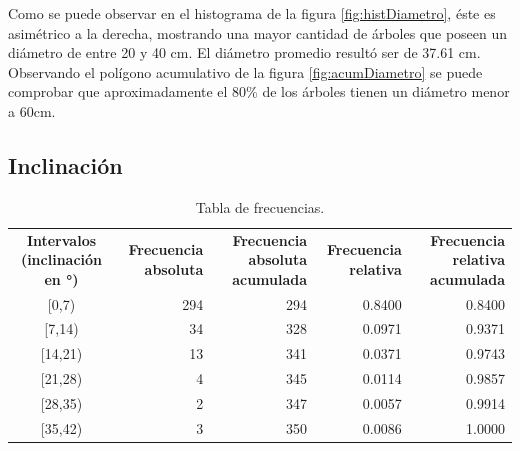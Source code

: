 \documentclass[11pt]{article}
\begin{document}
\begin{justify}
  Como se puede observar en el histograma de la figura \ref{fig:histDiametro}, 
  éste es asimétrico a la derecha, mostrando una mayor cantidad de árboles que
  poseen un diámetro de entre 20 y 40 cm. El diámetro promedio resultó ser 
  de 37.61 cm. Observando el polígono acumulativo de la figura
  \ref{fig:acumDiametro} se puede comprobar que aproximadamente el 80\%
  de los árboles tienen un diámetro menor a 60cm.
\end{justify}


\subsection{Inclinación}

\begin{table}[h!]
  \begin{center}
    \begin{tabular}{| c | r | r | r | r |}
      \hline
      \multirow{3}{3cm}{\centering\textbf{Intervalos (inclinación en °)}} & 
      \multirow{3}{2.5cm}{\centering\textbf{Frecuencia absoluta}} & 
      \multirow{3}{2.5cm}{\centering\textbf{Frecuencia absoluta acumulada}} &
      \multirow{3}{2.5cm}{\centering\textbf{Frecuencia relativa}} & 
      \multirow{3}{2.5cm}{\centering\textbf{Frecuencia relativa acumulada}} \\
      & & & & \\
      & & & & \\ \hline
      [0,7) & 294 & 294 & 0.8400 & 0.8400 \\ \hline
      [7,14) & 34 & 328 & 0.0971 & 0.9371 \\ \hline
      [14,21) & 13 & 341 & 0.0371 & 0.9743 \\ \hline
      [21,28) & 4 & 345 & 0.0114 & 0.9857 \\ \hline
      [28,35) & 2 & 347 & 0.0057 & 0.9914 \\ \hline
      [35,42) & 3 & 350 & 0.0086 & 1.0000 \\ \hline
    \end{tabular}
    \caption{Tabla de frecuencias.}
    \label{tab:tablaInclinacion}
  \end{center}
\end{table}
\end{document}
